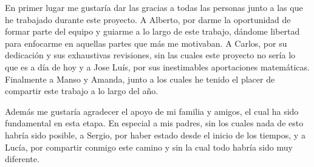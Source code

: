 En primer lugar me gustaría dar las gracias a todas las personas junto a las que
he trabajado durante este proyecto.
A Alberto, por darme la oportunidad de formar parte del equipo y
guiarme a lo largo de este trabajo, dándome libertad
para enfocarme en aquellas partes que más me motivaban. A Carlos, por su dedicación
y sus exhaustivas revisiones, sin las cuales este proyecto no sería lo que es
a día de hoy y a Jose Luís, por sus inestimables aportaciones
matemáticas. Finalmente a Manso y Amanda, junto a los
cuales he tenido el placer de compartir este trabajo a lo largo del año.

Además me gustaría agradecer el apoyo de mi familia y amigos, el cual ha
sido fundamental en esta etapa. En especial a mis padres, sin los
cuales nada de esto habría sido posible, a Sergio, por haber estado
desde el inicio de los tiempos, y a Lucía, por compartir conmigo este
camino y sin la cual todo habría sido muy diferente.
